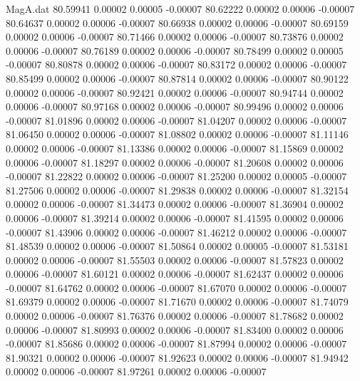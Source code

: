 \begin{filecontents}{MagA.dat}
  80.59941    0.00002    0.00005   -0.00007
  80.62222    0.00002    0.00006   -0.00007
  80.64637    0.00002    0.00006   -0.00007
  80.66938    0.00002    0.00006   -0.00007
  80.69159    0.00002    0.00006   -0.00007
  80.71466    0.00002    0.00006   -0.00007
  80.73876    0.00002    0.00006   -0.00007
  80.76189    0.00002    0.00006   -0.00007
  80.78499    0.00002    0.00005   -0.00007
  80.80878    0.00002    0.00006   -0.00007
  80.83172    0.00002    0.00006   -0.00007
  80.85499    0.00002    0.00006   -0.00007
  80.87814    0.00002    0.00006   -0.00007
  80.90122    0.00002    0.00006   -0.00007
  80.92421    0.00002    0.00006   -0.00007
  80.94744    0.00002    0.00006   -0.00007
  80.97168    0.00002    0.00006   -0.00007
  80.99496    0.00002    0.00006   -0.00007
  81.01896    0.00002    0.00006   -0.00007
  81.04207    0.00002    0.00006   -0.00007
  81.06450    0.00002    0.00006   -0.00007
  81.08802    0.00002    0.00006   -0.00007
  81.11146    0.00002    0.00006   -0.00007
  81.13386    0.00002    0.00006   -0.00007
  81.15869    0.00002    0.00006   -0.00007
  81.18297    0.00002    0.00006   -0.00007
  81.20608    0.00002    0.00006   -0.00007
  81.22822    0.00002    0.00006   -0.00007
  81.25200    0.00002    0.00005   -0.00007
  81.27506    0.00002    0.00006   -0.00007
  81.29838    0.00002    0.00006   -0.00007
  81.32154    0.00002    0.00006   -0.00007
  81.34473    0.00002    0.00006   -0.00007
  81.36904    0.00002    0.00006   -0.00007
  81.39214    0.00002    0.00006   -0.00007
  81.41595    0.00002    0.00006   -0.00007
  81.43906    0.00002    0.00006   -0.00007
  81.46212    0.00002    0.00006   -0.00007
  81.48539    0.00002    0.00006   -0.00007
  81.50864    0.00002    0.00005   -0.00007
  81.53181    0.00002    0.00006   -0.00007
  81.55503    0.00002    0.00006   -0.00007
  81.57823    0.00002    0.00006   -0.00007
  81.60121    0.00002    0.00006   -0.00007
  81.62437    0.00002    0.00006   -0.00007
  81.64762    0.00002    0.00006   -0.00007
  81.67070    0.00002    0.00006   -0.00007
  81.69379    0.00002    0.00006   -0.00007
  81.71670    0.00002    0.00006   -0.00007
  81.74079    0.00002    0.00006   -0.00007
  81.76376    0.00002    0.00006   -0.00007
  81.78682    0.00002    0.00006   -0.00007
  81.80993    0.00002    0.00006   -0.00007
  81.83400    0.00002    0.00006   -0.00007
  81.85686    0.00002    0.00006   -0.00007
  81.87994    0.00002    0.00006   -0.00007
  81.90321    0.00002    0.00006   -0.00007
  81.92623    0.00002    0.00006   -0.00007
  81.94942    0.00002    0.00006   -0.00007
  81.97261    0.00002    0.00006   -0.00007

\end{filecontents}

